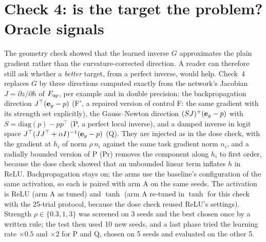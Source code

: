 \section{Check 4: is the target the problem? Oracle signals}\label{sec:oracle}
The geometry check showed that the learned inverse $G$ approximates the plain gradient rather than the curvature-corrected direction. A reader can therefore still ask whether a \emph{better} target, from a perfect inverse, would help. Check~4 replaces $G$ by three directions computed exactly from the network's Jacobian $J=\partial z/\partial h$ of $F_{\mathrm{up}}$, per example and in double precision: the backpropagation direction $J^\top(\mathbf{e}_y-p)$ (F$'$, a repaired version of control F: the same gradient with its strength set explicitly), the Gauss--Newton direction $(SJ)^{+}(\mathbf{e}_y-p)$ with $S=\mathrm{diag}(p)-pp^\top$ (P, a perfect local inverse), and a damped inverse in logit space $J^\top(JJ^\top+\alpha I)^{-1}(\mathbf{e}_y-p)$ (Q). They are injected as in the dose check, with the gradient at $h_i$ of norm $\rho\,n_i$ against the same task gradient norm $n_i$, and a radially bounded version of P (Pr) removes the component along $h_i$ to first order, because the dose check showed that an unbounded linear term inflates $h$ in ReLU. Backpropagation stays on; the arms use the baseline's configuration of the same activation, so each is paired with arm A on the same seeds. The activation is ReLU (arm A as tuned) and $\tanh$ (arm A re-tuned in $\tanh$ for this check with the 25-trial protocol, because the dose check reused ReLU's settings). Strength $\rho\in\{0.3,1,3\}$ was screened on 3 seeds and the best chosen once by a written rule; the test then used 10 new seeds, and a last phase tried the learning rate $\times0.5$ and $\times2$ for P and Q, chosen on 5 seeds and evaluated on the other 5.

\begin{table}[t]
\centering\small
\caption{Check 4: oracle signals added next to backpropagation, change in steps to target against arm A on the same 10 seeds (percent; negative is faster; $95\%$ bootstrap intervals), and the number of seeds that reached $0.97$ / $0.975$. The last row is arm D as tuned in $\tanh$, descriptive only.}
\label{tab:oracleb}
\end{table}

